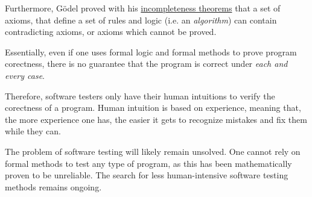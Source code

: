 \documentclass[a4paper]{article}
\begin{document}
\begin{itemize}
                Furthermore, Gödel proved with his \href{https://en.wikipedia.org/wiki/G%C3%B6del%27s_incompleteness_theorems}{incompleteness theorems} that a set of axioms, that define a set of rules and logic (i.e. an \emph{algorithm}) can contain contradicting axioms, or axioms which cannot be proved.

                Essentially, even if one uses formal logic and formal methods to prove program corectness, there is no guarantee that the program is correct under \emph{each and every case}.

                Therefore, software testers only have their human intuitions to verify the corectness of a program. Human intuition is based on experience, meaning that, the more experience one has, the easier it gets to recognize mistakes and fix them while they can.

                The problem of software testing will likely remain unsolved. One cannot rely on formal methods to test any type of program, as this has been mathematically proven to be unreliable. The search for less human-intensive software testing methods remains ongoing.

            \end{itemize}


                
\end{document}
